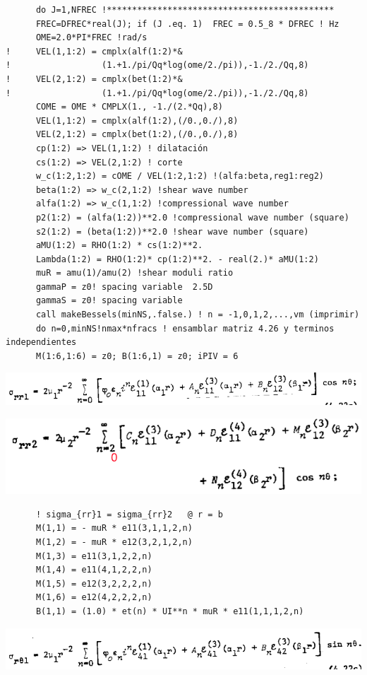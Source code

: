 \documentclass [11pt,spanish]{article}
\begin{document}
\begingroup
\fontsize{10pt}{12pt}
\selectfont
{}
\begin{shaded}
\begin{verbatim}
      do J=1,NFREC !*********************************************
      FREC=DFREC*real(J); if (J .eq. 1)  FREC = 0.5_8 * DFREC ! Hz
      OME=2.0*PI*FREC !rad/s
!     VEL(1,1:2) = cmplx(alf(1:2)*& 
!                  (1.+1./pi/Qq*log(ome/2./pi)),-1./2./Qq,8)
!     VEL(2,1:2) = cmplx(bet(1:2)*& 
!                  (1.+1./pi/Qq*log(ome/2./pi)),-1./2./Qq,8)
      COME = OME * CMPLX(1., -1./(2.*Qq),8)
      VEL(1,1:2) = cmplx(alf(1:2),(/0.,0./),8)
      VEL(2,1:2) = cmplx(bet(1:2),(/0.,0./),8)
      cp(1:2) => VEL(1,1:2) ! dilatación
      cs(1:2) => VEL(2,1:2) ! corte
      w_c(1:2,1:2) = cOME / VEL(1:2,1:2) !(alfa:beta,reg1:reg2)
      beta(1:2) => w_c(2,1:2) !shear wave number
      alfa(1:2) => w_c(1,1:2) !compressional wave number
      p2(1:2) = (alfa(1:2))**2.0 !compressional wave number (square)
      s2(1:2) = (beta(1:2))**2.0 !shear wave number (square)
      aMU(1:2) = RHO(1:2) * cs(1:2)**2.
      Lambda(1:2) = RHO(1:2)* cp(1:2)**2. - real(2.)* aMU(1:2)
      muR = amu(1)/amu(2) !shear moduli ratio
      gammaP = z0! spacing variable  2.5D
      gammaS = z0! spacing variable
      call makeBessels(minNS,.false.) ! n = -1,0,1,2,...,vm (imprimir)
      do n=0,minNS!nmax*nfracs ! ensamblar matriz 4.26 y terminos independientes
      M(1:6,1:6) = z0; B(1:6,1) = z0; iPIV = 6
\end{verbatim}
\end{shaded}
\endgroup
\includegraphics[scale=0.5]{srr1}

\includegraphics[scale=0.5]{srr2}
\begingroup
\fontsize{10pt}{12pt}
\selectfont
{}
\begin{shaded}
\begin{verbatim}
      ! sigma_{rr}1 = sigma_{rr}2   @ r = b
      M(1,1) = - muR * e11(3,1,1,2,n)
      M(1,2) = - muR * e12(3,2,1,2,n)
      M(1,3) = e11(3,1,2,2,n)
      M(1,4) = e11(4,1,2,2,n)
      M(1,5) = e12(3,2,2,2,n)
      M(1,6) = e12(4,2,2,2,n) 
      B(1,1) = (1.0) * et(n) * UI**n * muR * e11(1,1,1,2,n)
\end{verbatim}
\end{shaded}
\endgroup
\includegraphics[scale=0.5]{srt1}
\end{document}
